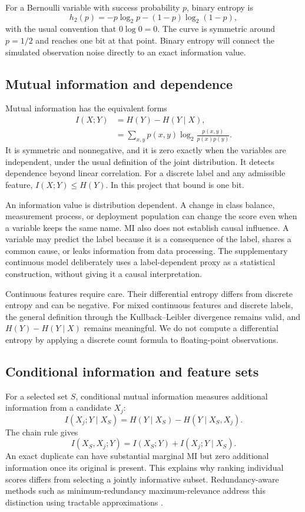 \documentclass[journal,11pt]{IEEEtran}
\begin{document}
For a Bernoulli variable with success probability $p$, binary entropy is
\begin{equation}
h_2(p)=-p\log_2p-(1-p)\log_2(1-p),
\end{equation}
with the usual convention that $0\log 0=0$. The curve is symmetric around $p=1/2$ and reaches one bit at that point. Binary entropy will connect the simulated observation noise directly to an exact information value.

\subsection{Mutual information and dependence}
Mutual information has the equivalent forms \cite{cover}
\begin{align}
I(X;Y)&=H(Y)-H(Y\mid X),\\
&=\sum_{x,y}p(x,y)\log_2\frac{p(x,y)}{p(x)p(y)}.
\end{align}
It is symmetric and nonnegative, and it is zero exactly when the variables are independent, under the usual definition of the joint distribution. It detects dependence beyond linear correlation. For a discrete label and any admissible feature, $I(X;Y)\leq H(Y)$. In this project that bound is one bit.

An information value is distribution dependent. A change in class balance, measurement process, or deployment population can change the score even when a variable keeps the same name. MI also does not establish causal influence. A variable may predict the label because it is a consequence of the label, shares a common cause, or leaks information from data processing. The supplementary continuous model deliberately uses a label-dependent proxy as a statistical construction, without giving it a causal interpretation.

Continuous features require care. Their differential entropy differs from discrete entropy and can be negative. For mixed continuous features and discrete labels, the general definition through the Kullback--Leibler divergence remains valid, and $H(Y)-H(Y\mid X)$ remains meaningful. We do not compute a differential entropy by applying a discrete count formula to floating-point observations.

\subsection{Conditional information and feature sets}
For a selected set $S$, conditional mutual information measures additional information from a candidate $X_j$:
\begin{equation}
I(X_j;Y\mid X_S)=H(Y\mid X_S)-H(Y\mid X_S,X_j).
\end{equation}
The chain rule gives
\begin{equation}
I(X_S,X_j;Y)=I(X_S;Y)+I(X_j;Y\mid X_S).
\end{equation}
An exact duplicate can have substantial marginal MI but zero additional information once its original is present. This explains why ranking individual scores differs from selecting a jointly informative subset. Redundancy-aware methods such as minimum-redundancy maximum-relevance address this distinction using tractable approximations \cite{peng}.
\end{document}
